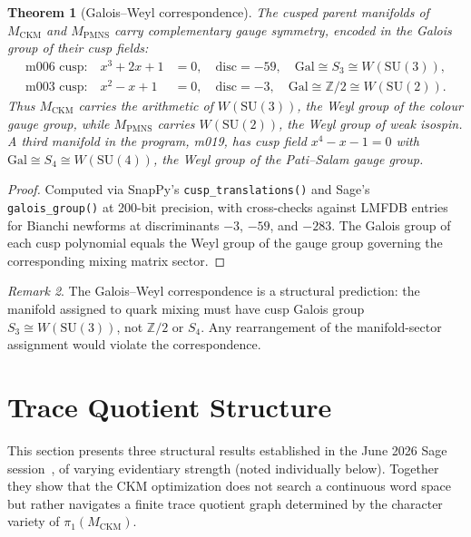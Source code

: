 \documentclass[11pt,a4paper]{article}
\newtheorem{theorem}{Theorem}
\theoremstyle{remark}
\newtheorem{remark}[theorem]{Remark}
\newcommand{\MCKM}{M_{\mathrm{CKM}}}
\newcommand{\MPMNS}{M_{\mathrm{PMNS}}}
\begin{document}
\begin{theorem}[Galois--Weyl correspondence]
\label{thm:galois_weyl}
The cusped parent manifolds of $\MCKM$ and $\MPMNS$ carry complementary
gauge symmetry, encoded in the Galois group of their cusp fields:
\begin{align}
\text{m006 cusp:}\quad x^3 + 2x + 1 &= 0,\quad
  \mathrm{disc} = -59,\quad \mathrm{Gal} \cong S_3 \cong W(\mathrm{SU}(3)),
  \label{eq:galois_ckm} \\
\text{m003 cusp:}\quad x^2 - x + 1 &= 0,\quad
  \mathrm{disc} = -3,\quad \mathrm{Gal} \cong \mathbb{Z}/2 \cong W(\mathrm{SU}(2)).
  \label{eq:galois_pmns}
\end{align}
Thus $\MCKM$ carries the arithmetic of $W(\mathrm{SU}(3))$, the Weyl group
of the colour gauge group, while $\MPMNS$ carries $W(\mathrm{SU}(2))$,
the Weyl group of weak isospin.
A third manifold in the program, m019, has cusp field $x^4 - x - 1 = 0$
with $\mathrm{Gal} \cong S_4 \cong W(\mathrm{SU}(4))$, the Weyl group of the
Pati--Salam gauge group.
\end{theorem}

\begin{proof}\sloppy
Computed via SnapPy's \texttt{cusp\_translations()} and
Sage's \texttt{galois\_group()} at 200-bit precision, with cross-checks
against LMFDB entries for Bianchi newforms at discriminants $-3$, $-59$,
and $-283$.
The Galois group of each cusp polynomial equals the Weyl group of the
gauge group governing the corresponding mixing matrix sector.
\fussy\end{proof}

\begin{remark}
The Galois--Weyl correspondence is a structural prediction: the manifold
assigned to quark mixing must have cusp Galois group $S_3 \cong W(\mathrm{SU}(3))$,
not $\mathbb{Z}/2$ or $S_4$.
Any rearrangement of the manifold-sector assignment would violate the
correspondence.
\end{remark}

\section{Trace Quotient Structure}
\label{sec:trace}

This section presents three structural results established in the
June 2026 Sage session~\cite{Gentry:arith}, of varying evidentiary strength
(noted individually below).
Together they show that the CKM optimization does not search a
continuous word space but rather navigates a finite trace quotient
graph determined by the character variety of $\pi_1(\MCKM)$.
\end{document}
